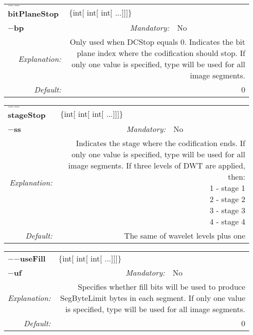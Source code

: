 \begin{center}\begin{tabular}{|rr|rlrl|}
\hline
\multicolumn{2}{|l|}{\textbf{$-$$-$bitPlaneStop}} & \multicolumn{4}{|l|}{$\{$int$[$ int$[$ int$[$ ...$]$$]$$]$$\}$} \\
\cline{3-6}
\multicolumn{2}{|l|}{\textbf{$-$bp}} & \emph{Mandatory:} & No & &  \\
\hline
\emph{Explanation:} & \multicolumn{5}{|p{12cm}|}{Only used when DCStop equals 0. Indicates the bit plane index where the codification should stop.  If only one value is specified, type will be used for all image segments.} \\
\hline
\emph{Default:} & \multicolumn{5}{|p{12cm}|}{0 } \\
\hline
\end{tabular}\end{center}
\begin{center}\begin{tabular}{|rr|rlrl|}
\hline
\multicolumn{2}{|l|}{\textbf{$-$$-$stageStop}} & \multicolumn{4}{|l|}{$\{$int$[$ int$[$ int$[$ ...$]$$]$$]$$\}$} \\
\cline{3-6}
\multicolumn{2}{|l|}{\textbf{$-$ss}} & \emph{Mandatory:} & No & &  \\
\hline
\emph{Explanation:} & \multicolumn{5}{|p{12cm}|}{Indicates the stage where the codification ends.  If only one value is specified, type will be used for all image segments. If three levels of DWT are applied, then: \newline 1 - stage 1 \newline 2 - stage 2 \newline 3 - stage 3 \newline 4 - stage 4 } \\
\hline
\emph{Default:} & \multicolumn{5}{|p{12cm}|}{The same of wavelet levels plus one} \\
\hline
\end{tabular}\end{center}
\begin{center}\begin{tabular}{|rr|rlrl|}
\hline
\multicolumn{2}{|l|}{\textbf{$-$$-$useFill}} & \multicolumn{4}{|l|}{$\{$int$[$ int$[$ int$[$ ...$]$$]$$]$$\}$} \\
\cline{3-6}
\multicolumn{2}{|l|}{\textbf{$-$uf}} & \emph{Mandatory:} & No & &  \\
\hline
\emph{Explanation:} & \multicolumn{5}{|p{12cm}|}{Specifies whether fill bits will be used to produce SegByteLimit bytes in each segment.  If only one value is specified, type will be used for all image segments.} \\
\hline
\emph{Default:} & \multicolumn{5}{|p{12cm}|}{0 } \\
\hline
\end{tabular}\end{center}
